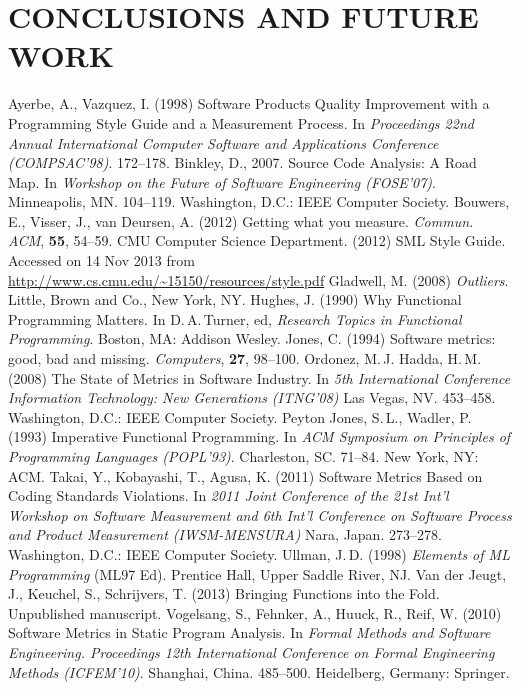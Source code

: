 \documentclass[12pt,abstracton]{scrartcl}
\begin{document}
\section{CONCLUSIONS AND FUTURE WORK}\label{sec:future}
\begin{thebibliography}{99}
 Ayerbe, A., Vazquez, I. (1998) Software Products Quality Improvement with a Programming Style Guide and a Measurement Process. In \emph{Proceedings 22nd Annual International Computer Software and Applications Conference (COMPSAC'98)}. 172--178.
 Binkley, D., 2007. Source Code Analysis: A Road Map. In \emph{Workshop on the Future of Software Engineering (FOSE'07)}. Minneapolis, MN. 104--119. Washington, D.C.: IEEE Computer Society.
 Bouwers, E., Visser, J., van Deursen, A. (2012) Getting what you measure. \emph{Commun. ACM}, \textbf{55}, 54--59.
 CMU Computer Science Department. (2012) SML Style Guide. Accessed on 14 Nov 2013 from \url{http://www.cs.cmu.edu/~15150/resources/style.pdf}
 Gladwell, M. (2008) \emph{Outliers}. Little, Brown and Co., New York, NY.
 Hughes, J. (1990) Why Functional Programming Matters. In D.\,A.\,Turner, ed, \emph{Research Topics in Functional Programming}. Boston, MA: Addison Wesley.
 Jones, C. (1994) Software metrics: good, bad and missing. \emph{Computers}, \textbf{27}, 98--100.
 Ordonez, M.\,J. Hadda, H.\,M. (2008) The State of Metrics in Software Industry. In \emph{5th International Conference Information Technology: New Generations (ITNG'08)} Las Vegas, NV. 453--458. Washington, D.C.: IEEE Computer Society.
 Peyton Jones, S.\,L., Wadler, P. (1993) Imperative Functional Programming. In \emph{ACM Symposium on Principles of Programming Languages (POPL'93)}. Charleston, SC. 71--84. New York, NY: ACM.
 Takai, Y., Kobayashi, T., Agusa, K. (2011) Software Metrics Based on Coding Standards Violations. In \emph{2011 Joint Conference of the 21st Int'l Workshop on Software Measurement and 6th Int'l Conference on Software Process and Product Measurement (IWSM-MENSURA)} Nara, Japan. 273--278. Washington, D.C.: IEEE Computer Society.
 Ullman, J.\,D. (1998) \emph{Elements of ML Programming} (ML97 Ed). Prentice Hall, Upper Saddle River, NJ.
 Van der Jeugt, J., Keuchel, S., Schrijvers, T. (2013) Bringing Functions into the Fold. Unpublished manuscript.
 Vogelsang, S., Fehnker, A., Huuck, R., Reif, W. (2010) Software Metrics in Static Program Analysis. In \emph{Formal Methods and Software Engineering. Proceedings 12th International Conference on Formal Engineering Methods (ICFEM'10)}. Shanghai, China. 485--500. Heidelberg, Germany: Springer.
\end{thebibliography}
\end{document}

